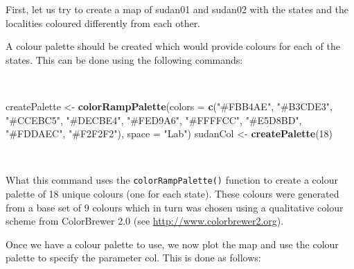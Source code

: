 \documentclass[12pt,a4paper,a4paper]{book}
\newenvironment{Shaded}{\begin{snugshade}}{\end{snugshade}}
\newcommand{\KeywordTok}[1]{\textcolor[rgb]{0.13,0.29,0.53}{\textbf{#1}}}
\newcommand{\DataTypeTok}[1]{\textcolor[rgb]{0.13,0.29,0.53}{#1}}
\newcommand{\DecValTok}[1]{\textcolor[rgb]{0.00,0.00,0.81}{#1}}
\newcommand{\FloatTok}[1]{\textcolor[rgb]{0.00,0.00,0.81}{#1}}
\newcommand{\StringTok}[1]{\textcolor[rgb]{0.31,0.60,0.02}{#1}}
\newcommand{\OtherTok}[1]{\textcolor[rgb]{0.56,0.35,0.01}{#1}}
\newcommand{\OperatorTok}[1]{\textcolor[rgb]{0.81,0.36,0.00}{\textbf{#1}}}
\newcommand{\NormalTok}[1]{#1}
\theoremstyle{definition}
\theoremstyle{definition}
\theoremstyle{definition}
\theoremstyle{remark}
\begin{document}
First, let us try to create a map of sudan01 and sudan02 with the states
and the localities coloured differently from each other.

A colour palette should be created which would provide colours for each
of the states. This can be done using the following commands:

~

\begin{Shaded}
\begin{Highlighting}[]
\NormalTok{createPalette <-}\StringTok{ }\KeywordTok{colorRampPalette}\NormalTok{(}\DataTypeTok{colors =} \KeywordTok{c}\NormalTok{(}\StringTok{"#FBB4AE"}\NormalTok{, }\StringTok{"#B3CDE3"}\NormalTok{, }\StringTok{"#CCEBC5"}\NormalTok{, }
                                             \StringTok{"#DECBE4"}\NormalTok{, }\StringTok{"#FED9A6"}\NormalTok{, }\StringTok{"#FFFFCC"}\NormalTok{, }
                                             \StringTok{"#E5D8BD"}\NormalTok{, }\StringTok{"#FDDAEC"}\NormalTok{, }\StringTok{"#F2F2F2"}\NormalTok{), }
                                  \DataTypeTok{space =} \StringTok{"Lab"}\NormalTok{)}
\NormalTok{sudanCol <-}\StringTok{ }\KeywordTok{createPalette}\NormalTok{(}\DecValTok{18}\NormalTok{)}
\end{Highlighting}
\end{Shaded}

~

What this command uses the \texttt{colorRampPalette()} function to
create a colour palette of 18 unique colours (one for each state). These
colours were generated from a base set of 9 colours which in turn was
chosen using a qualitative colour scheme from ColorBrewer 2.0 (see
\url{http://www.colorbrewer2.org}).

Once we have a colour palette to use, we now plot the map and use the
colour palette to specify the parameter col. This is done as follows:

~

\begin{Shaded}
\end{Shaded}
\end{document}
